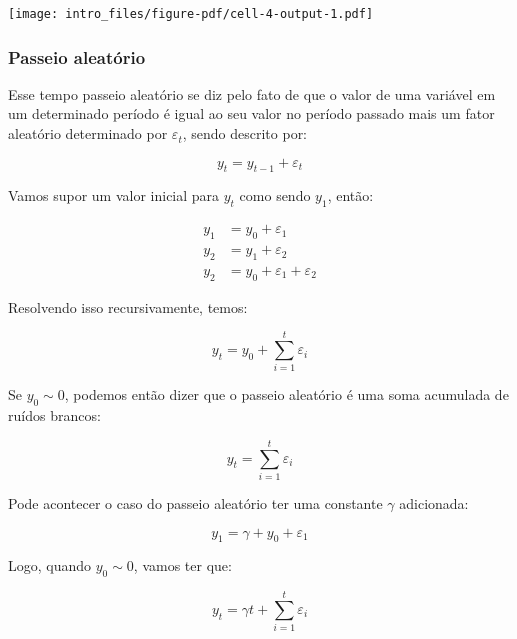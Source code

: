 \documentclass[
  letterpaper,
  DIV=11,
  numbers=noendperiod]{scrreprt}
\theoremstyle{definition}
\theoremstyle{plain}
\theoremstyle{remark}
\begin{document}
\texttt{[image: intro\_files/figure-pdf/cell-4-output-1.pdf]}

\subsubsection{Passeio aleatório}\label{passeio-aleatuxf3rio}

Esse tempo passeio aleatório se diz pelo fato de que o valor de uma
variável em um determinado período é igual ao seu valor no período
passado mais um fator aleatório determinado por \(\varepsilon_{t}\),
sendo descrito por:

\[
y_{t} = y_{t-1} + \varepsilon_{t}
\]

Vamos supor um valor inicial para \(y_{t}\) como sendo \(y_{1}\), então:

\[
\begin{aligned}
y_{1} &= y_{0} + \varepsilon_{1} \\
y_{2} &= y_{1} + \varepsilon_{2} \\
y_{2} &= y_{0} + \varepsilon_{1} + \varepsilon_{2}
\end{aligned}
\]

Resolvendo isso recursivamente, temos:

\[
y_{t} = y_{0} + \sum_{i=1}^{t} \varepsilon_{i}
\]

Se \(y_{0} \sim 0\), podemos então dizer que o passeio aleatório é uma
soma acumulada de ruídos brancos:

\[
y_{t} = \sum_{i=1}^{t} \varepsilon_{i}
\]

Pode acontecer o caso do passeio aleatório ter uma constante \(\gamma\)
adicionada:

\[
y_{1} = \gamma + y_{0} + \varepsilon_{1}
\]

Logo, quando \(y_{0} \sim 0\), vamos ter que:

\[
y_{t} = \gamma t + \sum_{i=1}^{t} \varepsilon_{i}
\]
\end{document}
